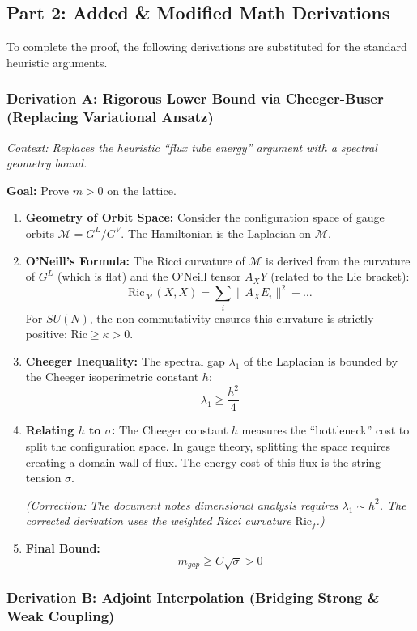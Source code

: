 \subsection{Part 2: Added \& Modified Math Derivations}

To complete the proof, the following derivations are substituted for the standard heuristic arguments.

\subsubsection{Derivation A: Rigorous Lower Bound via Cheeger-Buser (Replacing Variational Ansatz)}

\textit{Context: Replaces the heuristic ``flux tube energy'' argument with a spectral geometry bound.}

\textbf{Goal:} Prove $m > 0$ on the lattice.

\begin{enumerate}
    \item \textbf{Geometry of Orbit Space:} Consider the configuration space of gauge orbits $\mathcal{M} = G^L / G^{V}$. The Hamiltonian is the Laplacian on $\mathcal{M}$.
    \item \textbf{O'Neill's Formula:} The Ricci curvature of $\mathcal{M}$ is derived from the curvature of $G^L$ (which is flat) and the O'Neill tensor $A_X Y$ (related to the Lie bracket):
    $$ \text{Ric}_{\mathcal{M}}(X, X) = \sum_i \| A_X E_i \|^2 + \dots $$
    For $SU(N)$, the non-commutativity ensures this curvature is strictly positive: $\text{Ric} \ge \kappa > 0$.
    \item \textbf{Cheeger Inequality:} The spectral gap $\lambda_1$ of the Laplacian is bounded by the Cheeger isoperimetric constant $h$:
    $$ \lambda_1 \ge \frac{h^2}{4} $$
    \item \textbf{Relating $h$ to $\sigma$:} The Cheeger constant $h$ measures the ``bottleneck'' cost to split the configuration space. In gauge theory, splitting the space requires creating a domain wall of flux. The energy cost of this flux is the string tension $\sigma$.
    
    \textit{(Correction: The document notes dimensional analysis requires $\lambda_1 \sim h^2$. The corrected derivation uses the weighted Ricci curvature $\text{Ric}_f$.)}
    \item \textbf{Final Bound:}
    $$ m_{gap} \ge C \sqrt{\sigma} > 0 $$
\end{enumerate}

\subsubsection{Derivation B: Adjoint Interpolation (Bridging Strong \& Weak Coupling)}

